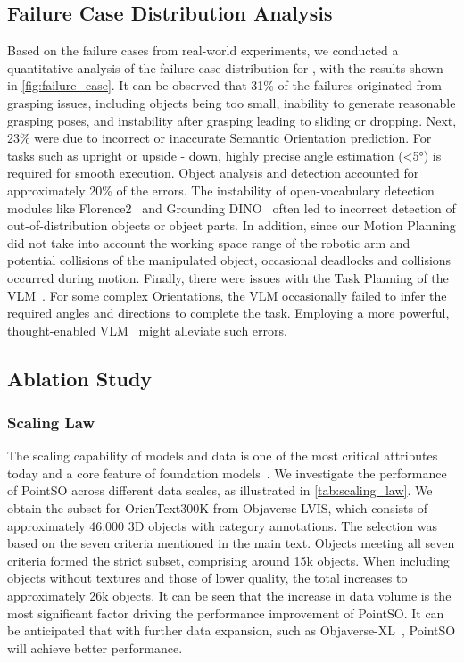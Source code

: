 \subsection{Failure Case Distribution Analysis}
Based on the failure cases from real-world experiments, we conducted a quantitative analysis of the failure case distribution for \sofar, with the results shown in \cref{fig:failure_case}. It can be observed that 31\% of the failures originated from grasping issues, including objects being too small, inability to generate reasonable grasping poses, and instability after grasping leading to sliding or dropping. Next, 23\% were due to incorrect or inaccurate Semantic Orientation prediction. For tasks such as upright or upside - down, highly precise angle estimation (<5°) is required for smooth execution. Object analysis and detection accounted for approximately 20\% of the errors. The instability of open-vocabulary detection modules like Florence2~\cite{florence2} and Grounding DINO~\cite{groundingdino23} often led to incorrect detection of out-of-distribution objects or object parts. In addition, since our Motion Planning did not take into account the working space range of the robotic arm and potential collisions of the manipulated object, occasional deadlocks and collisions occurred during motion. Finally, there were issues with the Task Planning of the VLM~\cite{GPT4o24,gemini23}. For some complex Orientations, the VLM occasionally failed to infer the required angles and directions to complete the task. Employing a more powerful, thought-enabled VLM~\cite{gpt_o1} might alleviate such errors.



\subsection{Ablation Study}\label{app:ablation}
\subsubsection{Scaling Law}
The scaling capability of models and data is one of the most critical attributes today and a core feature of foundation models~\cite{FoundationModel21}. We investigate the performance of PointSO across different data scales, as illustrated in \cref{tab:scaling_law}. 
We obtain the subset for OrienText300K from Objaverse-LVIS, which consists of approximately 46,000 3D objects with category annotations. The selection was based on the seven criteria mentioned in the main text. Objects meeting all seven criteria formed the strict subset, comprising around 15k objects. When including objects without textures and those of lower quality, the total increases to approximately 26k objects.
It can be seen that the increase in data volume is the most significant factor driving the performance improvement of PointSO. It can be anticipated that with further data expansion, such as Objaverse-XL~\cite{ObjaverseXL23}, PointSO will achieve better performance.


